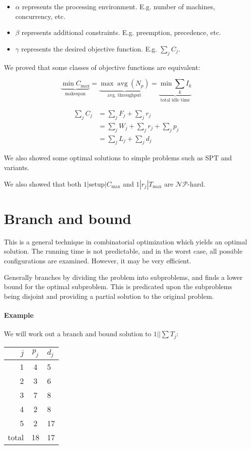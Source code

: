 \documentclass{idc_msc}
\newcommand{\NPclass}{\mathcal{NP}}
\DeclareMathOperator*{\avg}{avg}
\begin{document}
\begin{itemize}
  \item \(\alpha\) represents the processing environment. E.g. number of machines, concurrency, etc.
  \item \(\beta\) represents additional constraints. E.g. preemption, precedence, etc.
  \item \(\gamma\) represents the desired objective function. E.g. \(\sum_j C_j\).
\end{itemize}

We proved that some classes of objective functions are equivalent:

\[
\underbrace{\min C_{\max}}_{\text{makespan}}
= \underbrace{\max \avg(N_p)}_{\text{avg. throughput}}
= \underbrace{\min \sum_k I_k}_{\text{total idle time}}
\]

\[
\begin{aligned}
\sum_j C_j &= \sum_j F_j + \sum_j r_j \\
&= \sum_j W_j + \sum_j r_j + \sum_j p_j \\
&= \sum_j L_j + \sum_j d_j
\end{aligned}
\]

We also showed some optimal solutions to simple problems such as SPT and variants.

We also showed that both \(1|\text{setup}|C_{\max}\) and \(1|r_j|T_{\max}\) are \(\NPclass\)-hard.

\section{Branch and bound}

This is a general technique in combinatorial optimization which yields an optimal solution.
The running time is not predictable, and in the worst case, all possible configurations are examined.
However, it may be very efficient.

Generally branches by dividing the problem into subproblems, and finds a lower bound for the optimal subproblem.
This is predicated upon the subproblems being disjoint and providing a partial solution to the original problem.

\paragraph{Example}

We will work out a branch and bound solution to \(1||\sum T_j\):

\begin{tabu} to \linewidth{|r|c|l|}
\hline
\(j\) & \(p_j\) & \(d_j\) \\
 & 4 & 5 \\
2 & 3 & 6 \\
3 & 7 & 8 \\
4 & 2 & 8 \\
5 & 2 & 17 \\
\hline
total & 18 & 17 \\
\hline
\end{tabu}
\end{document}
